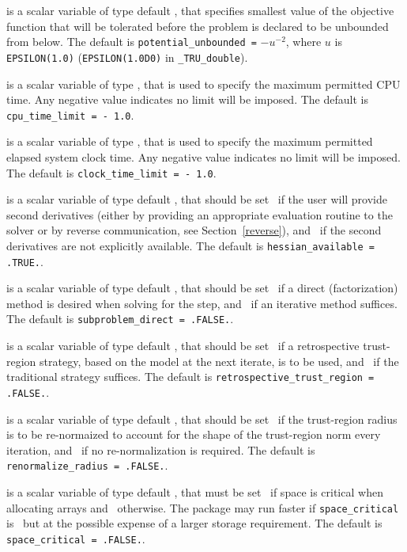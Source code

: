 \documentclass{galahad}
\newcommand{\packagename}{TRU}
\newcommand{\fullpackagename}{\libraryname\_\packagename}
\begin{document}
\begin{description}
  is a scalar variable of type default
\realdp, that specifies smallest
value of the objective function that will be tolerated before the problem
is declared to be unbounded from below.
The default is {\tt potential\_u\-nbounded =} $-u^{-2}$,
where $u$ is {\tt EPSILON(1.0)} ({\tt EPSILON(1.0D0)} in
{\tt \fullpackagename\_double}).

 is a scalar variable of type \realdp,
that is used to specify the maximum permitted CPU time. Any negative
value indicates no limit will be imposed. The default is
{\tt cpu\_time\_limit = - 1.0}.

 is a scalar variable of type \realdp,
that is used to specify the maximum permitted elapsed system clock time.
Any negative value indicates no limit will be imposed. The default is
{\tt clock\_time\_limit = - 1.0}.

is a scalar variable of type default \logical,
that should be set \true\ if the user will provide second derivatives
(either by providing an appropriate evaluation routine to the solver
or by reverse communication, see Section~\ref{reverse}), and
\false\ if the second derivatives are not explicitly available.
The default is {\tt hessian\_available = .TRUE.}.

is a scalar variable of type default \logical,
that should be set \true\ if a direct (factorization) method is
desired when solving for the step, and \false\ if an iterative
method suffices.
The default is {\tt subproblem\_direct = .FALSE.}.

is a scalar variable of type default \logical,
that should be set \true\ if a retrospective trust-region
strategy, based on the model at the next iterate, is to be used,
and \false\ if the traditional strategy suffices.
The default is {\tt  retrospective\_trust\_region = .FALSE.}.

is a scalar variable of type default \logical,
that should be set \true\ if the trust-region radius is to be
re-normaized to account for the shape of the trust-region norm
every iteration, and \false\ if no re-normalization is required.
The default is {\tt renormalize\_radius = .FALSE.}.

 is a scalar variable of type default \logical,
that must be set \true\ if space is critical when allocating arrays
and  \false\ otherwise. The package may run faster if
{\tt space\_critical} is \false\ but at the possible expense of a larger
storage requirement. The default is {\tt space\_critical = .FALSE.}.


\end{description}
\end{document}
